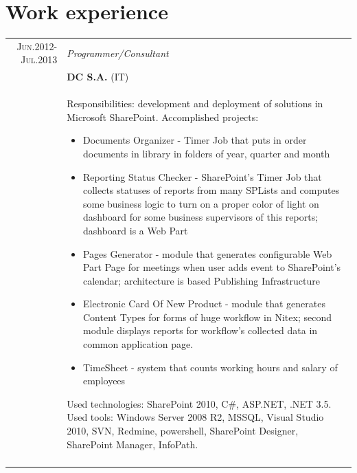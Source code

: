 \documentclass[a4paper,12pt]{article}
\begin{document}
\section{Work experience}
\begin{tabular}{r|p{11cm}}
	\textsc{Jun.2012-Jul.2013}
	&\emph{Programmer/Consultant} \\
	&\textsc{\textbf{DC S.A.}} (IT) \\
	&\footnotesize{
		Responsibilities: development and deployment of solutions in Microsoft SharePoint. \newline
		Accomplished projects:
		\begin{itemize}
			\item Documents Organizer - Timer Job that puts in order documents in library in folders of year, quarter and month
			\item Reporting Status Checker - SharePoint's Timer Job that collects statuses of reports from many SPLists and computes some business logic to
												turn
                                             on a proper color of light on dashboard for some business supervisors of this reports; dashboard is a Web Part
			\item Pages Generator - module that generates configurable Web Part Page for meetings when user adds event to SharePoint's calendar;
			architecture is based Publishing Infrastructure
			\item Electronic Card Of New Product - module that generates Content Types for forms of huge workflow in Nitex; second module displays reports
			for workflow's collected data in common application page.
			\item TimeSheet - system that counts working hours and salary of employees
		\end{itemize}
		Used technologies: SharePoint 2010, C\#, ASP.NET, .NET 3.5. Used tools: Windows Server 2008 R2, MSSQL, Visual Studio 2010,
		SVN, Redmine, powershell, SharePoint Designer, SharePoint Manager, InfoPath.
	}\\
	\multicolumn{2}{c}{}\\


\end{tabular}
\end{document}
